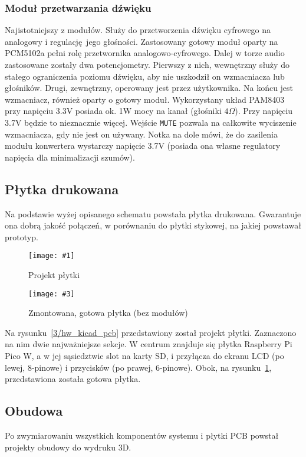 \documentclass[polish]{aghengthesis}
\newcommand{\imgintss}[5]{
	\begin{figure}[{#5}]
		\centering
		\begin{minipage}{.45\textwidth}
			\centering
			\texttt{[image: \#1]}
			\caption{#2}
			\label{#1}
		\end{minipage}%
		\hfill
		\begin{minipage}{.45\textwidth}
			\centering
			\texttt{[image: \#3]}
			\caption{#4}
			\label{#3}
		\end{minipage}
	\end{figure}
}
\newcommand{\imghss}[4]{\imgintss{#1}{#2}{#3}{#4}{H}}
\newcommand{\lstfile}[3]{
	\noindent
	\hspace{0.1\linewidth}
	\begin{minipage}{0.8\linewidth}
		
	\end{minipage}
	\vspace{0.3cm}
}
\begin{document}
			\subsubsection{Moduł przetwarzania dźwięku}
				Najistotniejszy z modułów. Służy do przetworzenia dźwięku cyfrowego na analogowy i regulację jego głośności. Zastosowany gotowy moduł\textsuperscript{\cite{hw_mod_dac}} oparty na PCM5102a pełni rolę przetwornika analogowo-cyfrowego. Dalej w torze audio zastosowane zostały dwa potencjometry. Pierwszy z nich, wewnętrzny służy do stałego ograniczenia poziomu dźwięku, aby nie uszkodził on wzmacniacza lub głośników. Drugi, zewnętrzny, operowany jest przez użytkownika. Na końcu jest wzmacniacz, również oparty o gotowy moduł\textsuperscript{\cite{hw_mod_amp}}. Wykorzystany układ PAM8403 przy napięciu 3.3V posiada ok. 1W mocy na kanał (głośniki $4 \Omega$). Przy napięciu 3.7V będzie to nieznacznie więcej. Wejście \lstinline|MUTE| pozwala na całkowite wyciszenie wzmacniacza, gdy nie jest on używany. Notka na dole mówi, że do zasilenia modułu konwertera wystarczy napięcie 3.7V (posiada ona własne regulatory napięcia dla minimalizacji szumów).
				
		\subsection{Płytka drukowana}
			Na podstawie wyżej opisanego schematu powstała płytka drukowana. Gwarantuje ona dobrą jakość połączeń, w porównaniu do płytki stykowej, na jakiej powstawał prototyp.
		
			\imghss{3/hw_kicad_pcb}{Projekt płytki}{3/hw_pcb}{Zmontowana, gotowa płytka (bez modułów)}
			
			Na rysunku~\ref{3/hw_kicad_pcb} przedstawiony został projekt płytki. Zaznaczono na nim dwie najważniejsze sekcje. W centrum znajduje się płytka Raspberry Pi Pico W, a w jej sąsiedztwie slot na karty SD, i przyłącza do ekranu LCD (po lewej, 8-pinowe) i przycisków (po prawej, 6-pinowe). Obok, na rysunku~\ref{3/hw_pcb}, przedstawiona została gotowa płytka.
			
		\subsection{Obudowa}
			Po zwymiarowaniu wszystkich komponentów systemu i płytki PCB powstał projekty obudowy do wydruku 3D.
			
			\lstfile{scad}{Kod generujący otwory na przyciski i śruby montażowe}{lst/3/buttons.scad}
			
\end{document}

